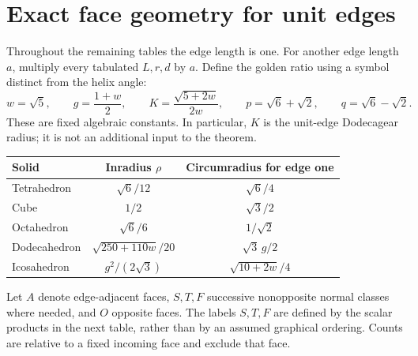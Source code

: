 \documentclass[11pt]{article}
\theoremstyle{definition}
\begin{document}
\section{Exact face geometry for unit edges}\label{sec:faces}
Throughout the remaining tables the edge length is one. For another edge
length $a$, multiply every tabulated $L,r,d$ by $a$. Define the golden ratio
using a symbol distinct from the helix angle:
\begin{equation}\label{eq:constants}
 w=\sqrt5,\qquad g=\frac{1+w}{2},\qquad
 K=\frac{\sqrt{5+2w}}{2w},\qquad
 p=\sqrt6+\sqrt2,\qquad q=\sqrt6-\sqrt2.
\end{equation}
These are fixed algebraic constants. In particular, $K$ is the unit-edge
Dodecagear radius; it is not an additional input to the theorem.

\begin{center}
\renewcommand{\arraystretch}{1.35}
\begin{tabular}{@{}lcc@{}}
\toprule
Solid & Inradius $\rho$ & Circumradius for edge one\\
\midrule
Tetrahedron & $\sqrt6/12$ & $\sqrt6/4$\\
Cube & $1/2$ & $\sqrt3/2$\\
Octahedron & $\sqrt6/6$ & $1/\sqrt2$\\
Dodecahedron & $\sqrt{250+110w}/20$ & $\sqrt3\,g/2$\\
Icosahedron & $g^2/(2\sqrt3)$ & $\sqrt{10+2w}/4$\\
\bottomrule
\end{tabular}
\end{center}

Let $A$ denote edge-adjacent faces, $S,T,F$ successive nonopposite normal
classes where needed, and $O$ opposite faces. The labels $S,T,F$ are defined
by the scalar products in the next table, rather than by an assumed graphical
ordering. Counts are relative to a fixed incoming face and exclude that face.
\end{document}
